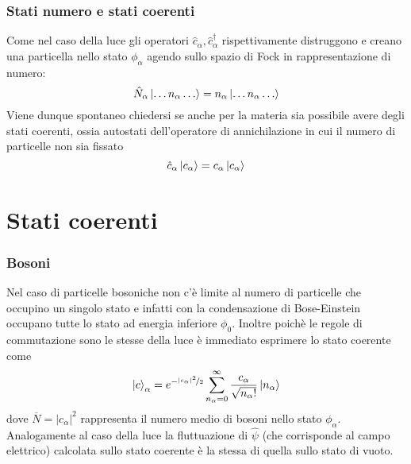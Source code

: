 \documentclass{beamer}
\begin{document}
\begin{frame}
  \frametitle{Stati numero e stati coerenti}
  Come nel caso della luce gli operatori $\hat{c}_{\alpha},\hat{c}_{\alpha}^\dagger$ rispettivamente distruggono e creano una particella nello stato $\phi_\alpha$ agendo sullo spazio di Fock in rappresentazione di numero:
  \begin{equation*}
    \hat{N}_\alpha \ket{\dots n_\alpha \dots} = n_\alpha \ket{\dots n_\alpha \dots}
  \end{equation*}
  Viene dunque spontaneo chiedersi se anche per la materia sia possibile avere degli stati coerenti, ossia autostati dell'operatore di annichilazione in cui il numero di particelle non sia fissato
  \begin{equation*}
    \hat{c}_\alpha \ket{c_\alpha} = c_\alpha \ket{c_\alpha}
  \end{equation*}
\end{frame}

\section{Stati coerenti}
\begin{frame}
  \frametitle{Bosoni}
  Nel caso di particelle bosoniche non c'è limite al numero di particelle che occupino un singolo stato e infatti con la condensazione di Bose-Einstein occupano tutte lo stato ad energia inferiore $\phi_0$. Inoltre poichè le regole di commutazione sono le stesse della luce è immediato esprimere lo stato coerente come
  \begin{equation*}
    \ket{c}_\alpha = e^{-\frac[f]{|c_\alpha|^2}{2}} \sum_{n_\alpha = 0}^\infty \frac{c_\alpha}{\sqrt{n_\alpha!}} \ket{n_\alpha}
  \end{equation*}
  dove $\overbar{N} = |c_\alpha|^2$ rappresenta il numero medio di bosoni nello stato $\phi_\alpha$.\\
  Analogamente al caso della luce la fluttuazione di $\hat{\psi}$ (che corrisponde al campo elettrico) calcolata sullo stato coerente è la stessa di quella sullo stato di vuoto.
\end{frame}
\end{document}
